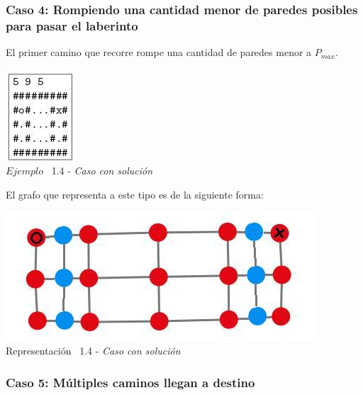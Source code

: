 \begin{center}
  \subsubsection*{Caso 4: Rompiendo una cantidad menor de paredes posibles para pasar el laberinto}
\end{center}

El primer camino que recorre rompe una cantidad de paredes menor a $P_{max}$.\\

\vspace*{0.3cm} \vspace*{0.3cm}
  \begin{center}
 \includegraphics[scale=1.6]{./EJ1/ej1random.jpeg}
\\ {$Ejemplo$ \ 1.4 - \textit{Caso con solución}}
  \end{center}
  \vspace*{0.3cm}

El grafo que representa a este tipo es de la siguiente forma:\\

\vspace*{0.3cm} \vspace*{0.3cm}
  \begin{center}
 \includegraphics[scale=0.5]{./EJ1/ej1graforandom.jpeg}
 \\{Representaci\'on \ 1.4 - \textit{Caso con solución}}
  \end{center}
  \vspace*{0.3cm}

\begin{center}
  \subsubsection*{Caso 5: M\'ultiples caminos llegan a destino}
\end{center}

